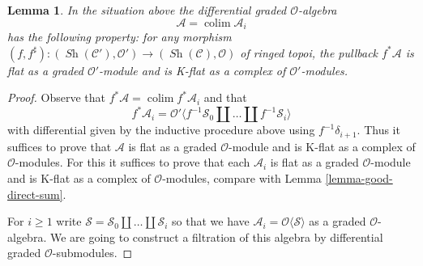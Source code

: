 \documentclass{stacks-project}
\theoremstyle{plain}
\newtheorem{lemma}[subsection]{Lemma}
\theoremstyle{definition}
\theoremstyle{remark}
\numberwithin{equation}{subsection}
\def\colim{\mathop{\mathrm{colim}}\nolimits}
\def\Sh{\mathop{\mathit{Sh}}\nolimits}
\begin{document}
\begin{lemma}
\label{lemma-special-good}
In the situation above the differential graded $\mathcal{O}$-algebra
$$
\mathcal{A} = \colim \mathcal{A}_i
$$
has the following property: for any morphism
$(f, f^\sharp) : (\Sh(\mathcal{C}'), \mathcal{O}')
\to (\Sh(\mathcal{C}), \mathcal{O})$
of ringed topoi, the pullback $f^*\mathcal{A}$
is flat as a graded $\mathcal{O}'$-module and
is K-flat as a complex of $\mathcal{O}'$-modules.
\end{lemma}

\begin{proof}
Observe that $f^*\mathcal{A} = \colim f^*\mathcal{A}_i$
and that
$$
f^*\mathcal{A}_i = \mathcal{O}'\langle
f^{-1}\mathcal{S}_0 \amalg \ldots \amalg f^{-1}\mathcal{S}_i\rangle
$$
with differential given by the inductive procedure above using
$f^{-1}\delta_{i + 1}$. Thus it suffices to prove that $\mathcal{A}$
is flat as a graded $\mathcal{O}$-module and
is K-flat as a complex of $\mathcal{O}$-modules.
For this it suffices to prove that each $\mathcal{A}_i$
is flat as a graded $\mathcal{O}$-module and
is K-flat as a complex of $\mathcal{O}$-modules, compare with
Lemma \ref{lemma-good-direct-sum}.


\medskip\noindent
For $i \geq 1$
write $\mathcal{S} = \mathcal{S}_0 \amalg \ldots \amalg \mathcal{S}_i$
so that we have $\mathcal{A}_i = \mathcal{O}\langle \mathcal{S} \rangle$
as a graded $\mathcal{O}$-algebra. We are going to construct a filtration
of this algebra by differential graded $\mathcal{O}$-submodules.


\end{proof}
\end{document}
